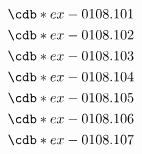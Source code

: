 \documentclass[12pt]{cdblatex}
\begin{document}
\begin{align*}
   &\cdb*{ex-0108.101}\\
   &\cdb*{ex-0108.102}\\
   &\cdb*{ex-0108.103}\\
   &\cdb*{ex-0108.104}\\
   &\cdb*{ex-0108.105}\\
   &\cdb*{ex-0108.106}\\
   &\cdb*{ex-0108.107}
\end{align*}
\end{document}
